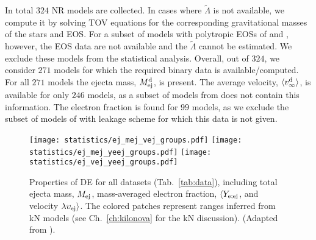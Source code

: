 In total $324$ \ac{NR} models are collected. In cases where $\tilde{\Lambda}$ 
is not available, we compute it by solving \ac{TOV} equations 
for the corresponding gravitational masses of the stars and \ac{EOS}.
% 
For a subset of models with polytropic \acp{EOS} of \citet{Bauswein:2013jpa}
and \citet{Kiuchi:2019lls}, however, the \ac{EOS} data are not available and 
the $\tilde{\Lambda}$ cannot be estimated. We exclude these models from the 
statistical analysis. Overall, out of $324$, we consider $271$ models for which 
the required binary data is available/computed. For all $271$ models the ejecta 
mass, $M^{\text{d}}_{\text{ej}}$, is present. The average velocity, $\langle v^{\text{d}}_\infty\rangle$, is available for only $246$ 
models, as a subset of models from \citet{Kiuchi:2019lls} does not contain this 
information. The electron fraction is found for $99$ models, as we exclude the 
subset of models of \citet{Lehner:2016lxy} with leakage scheme for which this 
data is not given. 

\begin{figure*}[t!]
    \centering 
    \texttt{[image: statistics/ej\_mej\_vej\_groups.pdf]}
    \texttt{[image: statistics/ej\_mej\_yeej\_groups.pdf]}
    \texttt{[image: statistics/ej\_vej\_yeej\_groups.pdf]}
    \caption{
        Properties of \ac{DE} for all datasets (Tab.~\ref{tab:data}), 
        including total ejecta mass, $M_{\rm ej}$, mass-averaged electron 
        fraction, $\langle Y_{\rm e;ej}$, and velocity 
        $\lambda\upsilon_{\rm ej}\rangle$. 
        The colored patches represent ranges inferred from \AT{} 
        \ac{kN} models \citep{Villar:2017wcc,Siegel:2019mlp}  
        (see Ch.~\ref{ch:kilonova} for the \ac{kN} discussion). 
        (Adapted from \citet{Nedora:2020qtd}). 
    }
    \label{fig:ejecta:dyn:ds}
\end{figure*}

